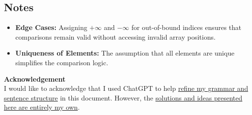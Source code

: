 \documentclass[10pt,letter,notitlepage]{article}
\begin{document}
\begin{Answer}
\subsection*{Notes}

\begin{itemize}
    \item \textbf{Edge Cases:} Assigning $+\infty$ and $-\infty$ for out-of-bound indices ensures that comparisons remain valid without accessing invalid array positions.
    \item \textbf{Uniqueness of Elements:} The assumption that all elements are unique simplifies the comparison logic.
\end{itemize}

\end{Answer}

\vspace{+0.5cm}

\par \textbf{Acknowledgement}\\

I would like to acknowledge that I used ChatGPT to help \underline{refine my grammar and sentence structure} in this document. However, the \underline{solutions and ideas presented here are entirely my own}. 
\end{document}
